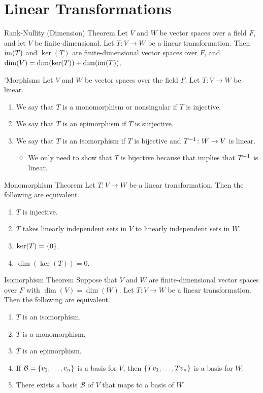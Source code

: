 \documentclass[class=article, crop=false]{standalone}
\begin{document}
  \section{Linear Transformations}
  \begin{theorem}{Rank-Nullity (Dimension) Theorem}
    Let $V$ and $W$ be vector spaces over a field $F$, and let $V$ be finite-dimensional. Let $T\colon V\to W$ be a linear transformation. Then $\operatorname{im}(T)$ and $\ker(T)$ are finite-dimensional vector spaces over $F$, and $\dim(V) = \dim(\ker(T)) + \dim(\operatorname{im}(T))$.
  \end{theorem}
  \begin{definition}{'Morphisms}
    Let $V$ and $W$ be vector spaces over the field $F$. Let $T\colon V\to W$ be linear.
    \begin{enumerate}[label=(\alph*)]
      \item We say that $T$ is a monomorphism or nonsingular if $T$ is injective.
      \item We say that $T$ is an epimorphism if $T$ is surjective.
      \item We say that $T$ is an isomorphism if $T$ is bijective and $T^{-1}\colon W\to V$ is linear.
      \begin{itemize}
        \item We only need to show that $T$ is bijective because that implies that $T^{-1}$ is linear.
      \end{itemize}
    \end{enumerate}
  \end{definition}
  \begin{theorem}{Monomorphism Theorem}
    Let $T\colon V\to W$ be a linear transformation. Then the following are equivalent.
    \begin{enumerate}[label=(\alph*)]
      \item $T$ is injective.
      \item $T$ takes linearly independent sets in $V$ to linearly independent sets in $W$.
      \item $\ker(T) = \left\{0\right\}$.
      \item $\dim(\ker(T)) = 0$.
    \end{enumerate}
  \end{theorem}
  \begin{theorem}{Isomorphism Theorem}
    Suppose that $V$ and $W$ are finite-dimensional vector spaces over $F$ with $\dim(V) = \dim(W)$. Let $T\colon V\to W$ be a linear transformation. Then the following are equivalent.
    \begin{enumerate}[label=(\alph*)]
      \item $T$ is an isomorphism.
      \item $T$ is a monomorphism.
      \item $T$ is an epimorphism.
      \item If $\mathcal{B} = \left\{v_1, \dotsc, v_n\right\}$ is a basis for $V$, then $\left\{Tv_1, \dotsc,Tv_n\right\}$ is a basis for $W$.
      \item There exists a basis $\mathcal{B}$ of $V$ that maps to a basis of $W$.
    \end{enumerate}
  \end{theorem}
\end{document}

